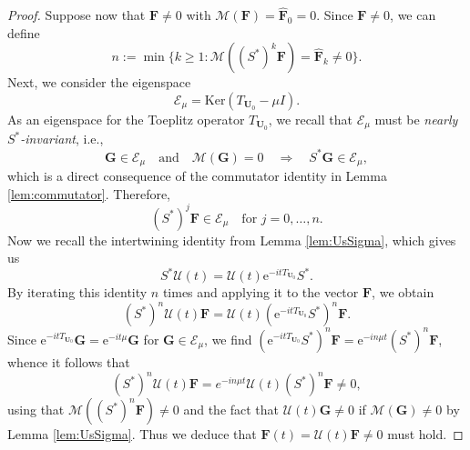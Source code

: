 \documentclass[10pt,a4paper]{amsart}
\newcommand{\Es}{\mathscr{E}}
\newcommand{\Fb}{\mathbf{F}}
\newcommand{\Gb}{\mathbf{G}}
\newcommand{\Mean}{\mathscr{M}}
\newcommand{\Ub}{\mathbf{U}}
\newcommand{\Us}{\mathscr{U}}
\newcommand{\be}{\begin{equation}}
\newcommand{\ee}{\end{equation}}
\newcommand{\eu}{\mathrm{e}}
\newcommand{\id}{I}
\renewcommand{\geq}{\geqslant}
\renewcommand{\ker}{\mathrm{Ker}}
\begin{document}
\begin{proof}
Suppose now that $\Fb \neq 0$ with $\Mean(\Fb)=\widehat{\Fb}_0=0$. Since $\Fb \neq 0$, we can define 
$$
n := \min \{ k \geq 1 : \Mean((S^*)^k \Fb) = \widehat{\Fb}_k \neq 0 \}.
$$
Next, we consider the eigenspace
$$
\Es_{\mu} = \ker ( T_{\Ub_0} - \mu \id).
$$
As an eigenspace for the Toeplitz operator $T_{\Ub_0}$, we recall that $\Es_\mu$ must be {\em nearly $S^*$-invariant}, i.e., 
$$
\Gb \in \Es_\mu \quad \mbox{and} \quad \Mean(\Gb) = 0 \quad \Rightarrow \quad S^* \Gb \in \Es_\mu,
$$
which is a direct consequence of the commutator identity in Lemma \ref{lem:commutator}. Therefore, 
$$
(S^*)^j \Fb \in \Es_{\mu} \quad \mbox{for $j=0, \ldots, n$}.
$$ 
Now we recall the intertwining identity from Lemma \ref{lem:UsSigma}, which gives us
\be \label{eq:intertwine}
S^* \Us(t) = \Us(t) \eu^{-it T_{\Ub_0}} S^*.
\ee
By iterating this identity $n$ times and applying it to the vector $\Fb$, we obtain
$$
(S^*)^n \Us(t) \Fb = \Us(t) (\eu^{-it T_{\Ub_0}} S^*)^n \Fb.
$$
Since $\eu^{-it T_{\Ub_0}} \Gb = \eu^{-it \mu} \Gb$ for $\Gb \in \Es_\mu$, we find $(\eu^{-it T_{\Ub_0}} S^*)^n \Fb= \eu^{-in \mu t} (S^*)^n \Fb$, whence it follows that
$$
(S^*)^n \Us(t) \Fb= e^{-in \mu t} \Us(t) (S^*)^n \Fb \neq 0,
$$
using that $\Mean((S^*)^n \Fb) \neq 0$ and the fact that $\Us(t) \Gb \neq 0$ if $\Mean(\Gb) \neq 0$ by Lemma \ref{lem:UsSigma}. Thus we deduce that $\Fb(t) = \Us(t) \Fb \neq 0$ must hold.
\end{proof}
\end{document}
